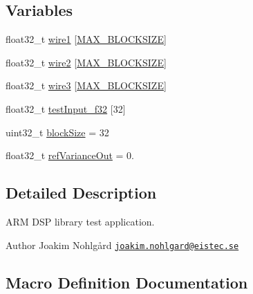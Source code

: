 \subsection*{Variables}
\begin{DoxyCompactItemize}
\item 
float32\+\_\+t \hyperlink{pkg__cmsis-dsp_2main_8c_acc43b372d92d5027b9f9cac782c8b3c7}{wire1} \mbox{[}\hyperlink{pkg__cmsis-dsp_2main_8c_af8a1d2ed31f7c9a00fec46a798edb61b}{M\+A\+X\+\_\+\+B\+L\+O\+C\+K\+S\+I\+ZE}\mbox{]}
\item 
float32\+\_\+t \hyperlink{pkg__cmsis-dsp_2main_8c_a41a9afab5be5ccd2e6f618b83102f0d1}{wire2} \mbox{[}\hyperlink{pkg__cmsis-dsp_2main_8c_af8a1d2ed31f7c9a00fec46a798edb61b}{M\+A\+X\+\_\+\+B\+L\+O\+C\+K\+S\+I\+ZE}\mbox{]}
\item 
float32\+\_\+t \hyperlink{pkg__cmsis-dsp_2main_8c_af61f43ad332a2322e43ced590b6d9768}{wire3} \mbox{[}\hyperlink{pkg__cmsis-dsp_2main_8c_af8a1d2ed31f7c9a00fec46a798edb61b}{M\+A\+X\+\_\+\+B\+L\+O\+C\+K\+S\+I\+ZE}\mbox{]}
\item 
float32\+\_\+t \hyperlink{pkg__cmsis-dsp_2main_8c_a9170ec9e681e2b519fe9c46a30455841}{test\+Input\+\_\+f32} \mbox{[}32\mbox{]}
\item 
uint32\+\_\+t \hyperlink{pkg__cmsis-dsp_2main_8c_ab6558f40a619c2502fbc24c880fd4fb0}{block\+Size} = 32
\item 
float32\+\_\+t \hyperlink{pkg__cmsis-dsp_2main_8c_a26cbbfe2a7905669e8440159465050df}{ref\+Variance\+Out} = 0.
\end{DoxyCompactItemize}


\subsection{Detailed Description}
A\+RM D\+SP library test application. 

\begin{DoxyAuthor}{Author}
Joakim Nohlgård \href{mailto:joakim.nohlgard@eistec.se}{\tt joakim.\+nohlgard@eistec.\+se} 
\end{DoxyAuthor}


\subsection{Macro Definition Documentation}
\mbox{\label{pkg__cmsis-dsp_2main_8c_a3fd2b1bcd7ddcf506237987ad780f495}} 
